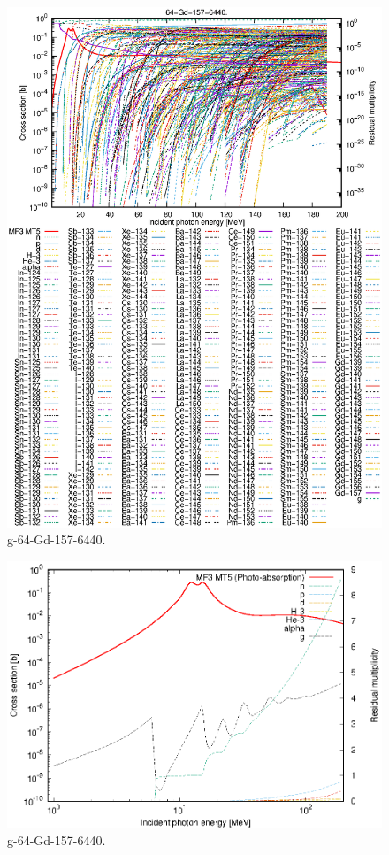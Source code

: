 \begin{figure}
 \includegraphics[width=\linewidth]{eps/g_64-Gd-157_6440.eps}
  \caption{g-64-Gd-157-6440.}
\end{figure}
\newpage \clearpage

\begin{figure}
 \includegraphics[width=\linewidth]{eps-log/g_64-Gd-157_6440.eps}
 \caption{g-64-Gd-157-6440.}
\end{figure}
\newpage \clearpage

